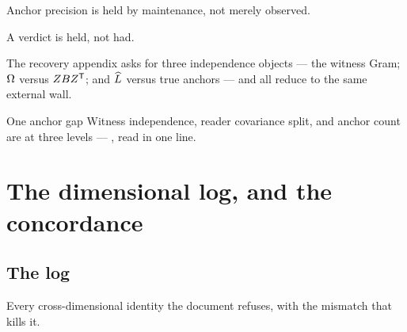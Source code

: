 \documentclass[../main]{subfiles}
\begin{document}
\begin{insight}
  Anchor precision is held by maintenance, not merely observed.
\end{insight}

\begin{insight}
  A verdict is held, not had.
\end{insight}

\begin{theorem}
  The recovery appendix asks for three independence objects --- the witness Gram;
  $\Omega$ versus $ZBZ\sp{\mathsf{T}}$; and
  $\widehat{L}$ versus true anchors --- and all reduce to the same external wall.
\end{theorem}

\begin{statement}{}{One anchor gap}
  Witness independence, reader covariance split, and anchor count are 
  at three levels --- , read in one line.
\end{statement}


\clearpage
\section{The dimensional log, and the concordance}
\label{app:log}

\subsection{The \texorpdfstring{}{g:knock} log}
\label{subsec:log:knock}
Every cross-dimensional identity the document refuses, with the mismatch that kills it.
\end{document}
